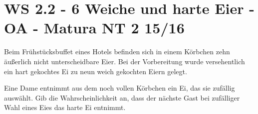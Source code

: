 \section{WS 2.2 - 6 Weiche und harte Eier - OA - Matura NT 2 15/16}

\begin{beispiel}{0} %
Beim Frühstücksbuffet eines Hotels befinden sich in einem Körbchen zehn äußerlich nicht unterscheidbare Eier. Bei der Vorbereitung wurde versehentlich ein hart gekochtes Ei zu neun weich gekochten Eiern gelegt. \leer

Eine Dame entnimmt aus dem noch vollen Körbchen ein Ei, das sie zufällig auswählt.
Gib die Wahrscheinlichkeit an, dass der nächste Gast bei zufälliger Wahl eines Eies das
harte Ei entnimmt.

\end{beispiel}